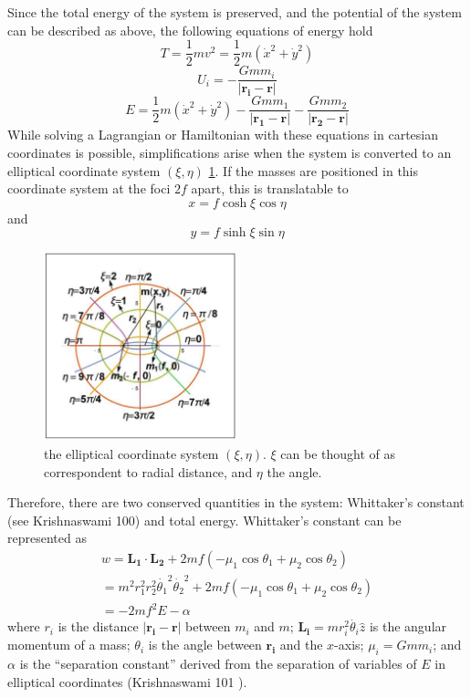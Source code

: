\documentclass[preprint,titlepage,preprintnumbers,amsmath,amssymb,aps,11pt]{revtex4-2}
\begin{document}
Since the total energy of the system is preserved, and the potential of the system can be described as above, the following equations of energy hold
\begin{equation}
    T=\frac{1}{2}mv^2=\frac{1}{2}m(\dot{x}^2 + \dot{y}^2)
\end{equation}
\begin{equation}
    U_i=-\frac{Gmm_i}{|\bm{r_i}-\bm{r}|}
\end{equation}
\begin{equation}
    E=\frac{1}{2}m(\dot{x}^2 + \dot{y}^2)-\frac{Gmm_1}{|\bm{r_1}-\bm{r}|}-\frac{Gmm_2}{|\bm{r_2}-\bm{r}|}
\end{equation}
While solving a Lagrangian or Hamiltonian with these equations in cartesian coordinates is possible, simplifications arise when the system is converted to an elliptical coordinate system $(\xi,\eta)$ \ref{fig:coordinatesys}. If the masses are positioned in this coordinate system at the foci $2f$ apart, this is translatable to \[x=f\cosh{\xi}\cos{\eta}\] and \[y=f\sinh{\xi}\sin{\eta}\]
\begin{figure}
    \centering
    \includegraphics[width=0.5\textwidth]{Fig 2.png}
    \caption{the elliptical coordinate system $(\xi,\eta)$. $\xi$ can be thought of as correspondent to radial distance, and $\eta$ the angle.}
    \label{fig:coordinatesys}
\end{figure}
Therefore, there are two conserved quantities in the system: Whittaker's constant (see Krishnaswami 100) and total energy. Whittaker's constant can be represented as
\begin{equation}
    \begin{aligned}
        w=\bm{L_1}\cdot\bm{L_2}+2mf(-\mu _1 \cos{\theta _1} +\mu _2 \cos{\theta _2}) \\
        =m^2r_1^2r_2^2\dot{\theta _1}^2\dot{\theta _2}^2+2mf(-\mu _1 \cos{\theta _1} +\mu _2 \cos{\theta _2})\\
        =-2mf^2E-\alpha
    \end{aligned}
\end{equation}
where $r_i$ is the distance $|\bm{r_i}-\bm{r}|$ between $m_i$ and $m$; $\bm{L_i}=mr_i^2\dot{\theta _i}\hat{z}$ is the angular momentum of a mass; $\theta _i$ is the angle between $\bm{r_i}$ and the $x$-axis; $\mu _i=Gmm_i$; and $\alpha$ is the “separation constant” derived from the separation of variables of $E$ in elliptical coordinates (Krishnaswami 101 \cite{Krishnaswami2019}).
\end{document}
